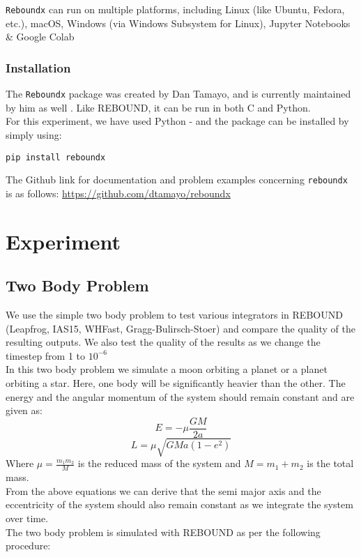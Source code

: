 \documentclass[12pt,a4paper]{article}
\begin{document}
\texttt{Reboundx} can run on multiple platforms, including Linux (like Ubuntu, Fedora, etc.), macOS, Windows (via Windows Subsystem for Linux), Jupyter Notebooks \& Google Colab
\subsubsection{Installation}
The \texttt{Reboundx} package was created by Dan Tamayo, and is currently maintained by him as well \cite{Tamayo_2019}. Like REBOUND, it can be run in both C and Python. \\
For this experiment, we have used Python - and the package can be installed by simply using:
\begin{verbatim}
pip install reboundx
\end{verbatim}
The Github link for documentation and problem examples concerning \texttt{reboundx} is as follows: \href{https://github.com/dtamayo/reboundx}{https://github.com/dtamayo/reboundx}

\section{Experiment}
\subsection{Two Body Problem}
\label{sec:2body}
We use the simple two body problem to test various integrators in REBOUND (Leapfrog, IAS15, WHFast, Gragg-Bulirsch-Stoer) and compare the quality of the resulting outputs.
We also test the quality of the results as we change the timestep from 1 to $10^{-6}$\\
In this two body problem we simulate a moon orbiting a planet or a planet orbiting a star. Here, one body will be significantly heavier than the other. 
The energy and the angular momentum of the system should remain constant and are given as: 
\begin{equation}
   E = -\mu \frac{GM}{2a}
\end{equation}
\begin{equation}
  L = \mu \sqrt{GMa(1-e^2)}
\end{equation}
Where $\mu = \frac{m_1m_2}{M}$ is the reduced mass of the system and $M=m_1+m_2$ is the total mass.\\
From the above equations we can derive that the semi major axis and the eccentricity of the system should also remain constant as we integrate the system over time.\\
The two body problem is simulated with REBOUND as per the following procedure:
\end{document}
